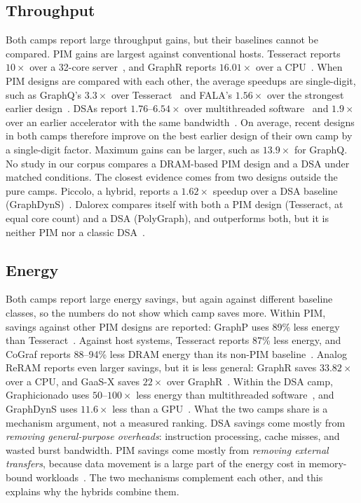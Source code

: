 \documentclass[journal,onecolumn]{IEEEtran}
\begin{document}
\subsection{Throughput}
Both camps report large throughput gains, but their baselines cannot be compared. PIM gains are largest against conventional hosts. Tesseract reports $10\times$ over a 32-core server~\cite{ahn2015tesseract}, and GraphR reports $16.01\times$ over a CPU~\cite{song2018graphr}. When PIM designs are compared with each other, the average speedups are single-digit, such as GraphQ's $3.3\times$ over Tesseract~\cite{zhuo2019graphq} and FALA's $1.56\times$ over the strongest earlier design~\cite{shin2025fala}. DSAs report $1.76$--$6.54\times$ over multithreaded software~\cite{ham2016graphicionado} and $1.9\times$ over an earlier accelerator with the same bandwidth~\cite{yan2019graphdyns}. On average, recent designs in both camps therefore improve on the best earlier design of their own camp by a single-digit factor. Maximum gains can be larger, such as $13.9\times$ for GraphQ. No study in our corpus compares a DRAM-based PIM design and a DSA under matched conditions. The closest evidence comes from two designs outside the pure camps. Piccolo, a hybrid, reports a $1.62\times$ speedup over a DSA baseline (GraphDynS)~\cite{shin2025piccolo}. Dalorex compares itself with both a PIM design (Tesseract, at equal core count) and a DSA (PolyGraph), and outperforms both, but it is neither PIM nor a classic DSA~\cite{orenesvera2023dalorex}.

\subsection{Energy}
Both camps report large energy savings, but again against different baseline classes, so the numbers do not show which camp saves more. Within PIM, savings against other PIM designs are reported: GraphP uses 89\% less energy than Tesseract~\cite{zhang2018graphp}. Against host systems, Tesseract reports 87\% less energy, and CoGraf reports 88--94\% less DRAM energy than its non-PIM baseline~\cite{ahn2015tesseract,yenimol2026cograf}. Analog ReRAM reports even larger savings, but it is less general: GraphR saves $33.82\times$ over a CPU, and GaaS-X saves $22\times$ over GraphR~\cite{song2018graphr,challapalle2020gaasx}. Within the DSA camp, Graphicionado uses $50$--$100\times$ less energy than multithreaded software~\cite{ham2016graphicionado}, and GraphDynS uses $11.6\times$ less than a GPU~\cite{yan2019graphdyns}. What the two camps share is a mechanism argument, not a measured ranking. DSA savings come mostly from \emph{removing general-purpose overheads}: instruction processing, cache misses, and wasted burst bandwidth. PIM savings come mostly from \emph{removing external transfers}, because data movement is a large part of the energy cost in memory-bound workloads~\cite{gomezluna2022prim}. The two mechanisms complement each other, and this explains why the hybrids combine them.
\end{document}
